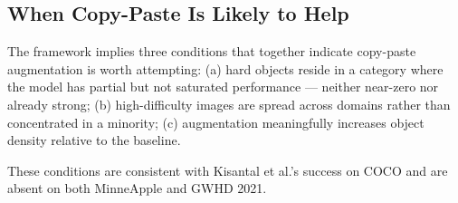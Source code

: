 \documentclass[10pt, a4paper]{article}
\begin{document}
\subsection{When Copy-Paste Is Likely to Help}

The framework implies three conditions that together indicate
copy-paste augmentation is worth attempting:
(a) hard objects reside in a category where the model has partial
but not saturated performance --- neither near-zero nor already strong;
(b) high-difficulty images are spread across domains rather than
concentrated in a minority;
(c) augmentation meaningfully increases object density relative to
the baseline.

These conditions are consistent with Kisantal et al.'s success on COCO
and are absent on both MinneApple and GWHD 2021.



\end{document}
